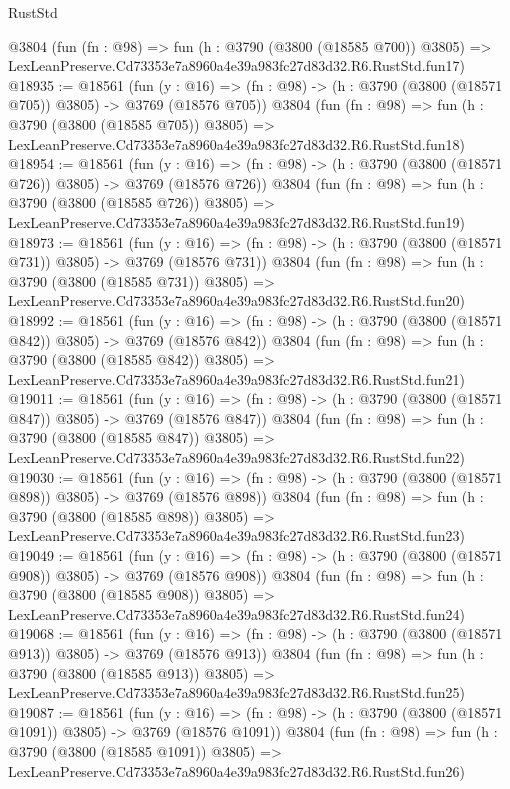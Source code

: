 \begin{lexlean}{RustStd}
\begin{coremodule}
    @3804
    (fun (fn : @98) =>
    fun (h : @3790 (@3800 (@18585 @700)) @3805) =>
    LexLeanPreserve.Cd73353e7a8960a4e39a983fc27d83d32.R6.RustStd.fun17)
@18935 := @18561
    (fun (y : @16) => (fn : @98) -> (h : @3790 (@3800 (@18571 @705)) @3805) -> @3769 (@18576 @705))
    @3804
    (fun (fn : @98) =>
    fun (h : @3790 (@3800 (@18585 @705)) @3805) =>
    LexLeanPreserve.Cd73353e7a8960a4e39a983fc27d83d32.R6.RustStd.fun18)
@18954 := @18561
    (fun (y : @16) => (fn : @98) -> (h : @3790 (@3800 (@18571 @726)) @3805) -> @3769 (@18576 @726))
    @3804
    (fun (fn : @98) =>
    fun (h : @3790 (@3800 (@18585 @726)) @3805) =>
    LexLeanPreserve.Cd73353e7a8960a4e39a983fc27d83d32.R6.RustStd.fun19)
@18973 := @18561
    (fun (y : @16) => (fn : @98) -> (h : @3790 (@3800 (@18571 @731)) @3805) -> @3769 (@18576 @731))
    @3804
    (fun (fn : @98) =>
    fun (h : @3790 (@3800 (@18585 @731)) @3805) =>
    LexLeanPreserve.Cd73353e7a8960a4e39a983fc27d83d32.R6.RustStd.fun20)
@18992 := @18561
    (fun (y : @16) => (fn : @98) -> (h : @3790 (@3800 (@18571 @842)) @3805) -> @3769 (@18576 @842))
    @3804
    (fun (fn : @98) =>
    fun (h : @3790 (@3800 (@18585 @842)) @3805) =>
    LexLeanPreserve.Cd73353e7a8960a4e39a983fc27d83d32.R6.RustStd.fun21)
@19011 := @18561
    (fun (y : @16) => (fn : @98) -> (h : @3790 (@3800 (@18571 @847)) @3805) -> @3769 (@18576 @847))
    @3804
    (fun (fn : @98) =>
    fun (h : @3790 (@3800 (@18585 @847)) @3805) =>
    LexLeanPreserve.Cd73353e7a8960a4e39a983fc27d83d32.R6.RustStd.fun22)
@19030 := @18561
    (fun (y : @16) => (fn : @98) -> (h : @3790 (@3800 (@18571 @898)) @3805) -> @3769 (@18576 @898))
    @3804
    (fun (fn : @98) =>
    fun (h : @3790 (@3800 (@18585 @898)) @3805) =>
    LexLeanPreserve.Cd73353e7a8960a4e39a983fc27d83d32.R6.RustStd.fun23)
@19049 := @18561
    (fun (y : @16) => (fn : @98) -> (h : @3790 (@3800 (@18571 @908)) @3805) -> @3769 (@18576 @908))
    @3804
    (fun (fn : @98) =>
    fun (h : @3790 (@3800 (@18585 @908)) @3805) =>
    LexLeanPreserve.Cd73353e7a8960a4e39a983fc27d83d32.R6.RustStd.fun24)
@19068 := @18561
    (fun (y : @16) => (fn : @98) -> (h : @3790 (@3800 (@18571 @913)) @3805) -> @3769 (@18576 @913))
    @3804
    (fun (fn : @98) =>
    fun (h : @3790 (@3800 (@18585 @913)) @3805) =>
    LexLeanPreserve.Cd73353e7a8960a4e39a983fc27d83d32.R6.RustStd.fun25)
@19087 := @18561
    (fun (y : @16) =>
    (fn : @98) -> (h : @3790 (@3800 (@18571 @1091)) @3805) -> @3769 (@18576 @1091))
    @3804
    (fun (fn : @98) =>
    fun (h : @3790 (@3800 (@18585 @1091)) @3805) =>
    LexLeanPreserve.Cd73353e7a8960a4e39a983fc27d83d32.R6.RustStd.fun26)

\end{coremodule}
\end{lexlean}
